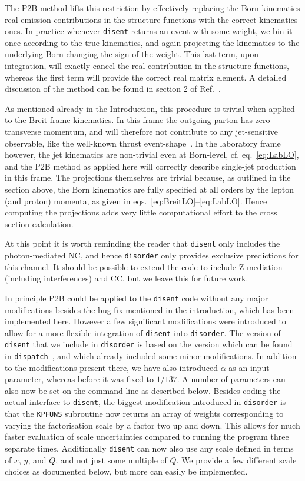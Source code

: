 \documentclass[submission, PhysCodeb]{SciPost_better_arXiv}
\newcommand{\disent}{{\tt disent}}
\newcommand{\disorder}{{\tt disorder}}
\begin{document}
The P2B method lifts this restriction by effectively replacing the
Born-kinematics real-emission contributions in the structure functions
with the correct kinematics ones. In practice whenever \disent{}
returns an event with some weight, we bin it once according to the
true kinematics, and again projecting the kinematics to the underlying
Born changing the sign of the weight. This last term, upon
integration, will exactly cancel the real contribution in the
structure functions, whereas the first term will provide the correct
real matrix element. A detailed discussion of the method can be found
in section 2 of Ref.~\cite{Currie:2018fgr}.

As mentioned already in the Introduction, this procedure is trivial
when applied to the Breit-frame kinematics. In this frame the outgoing
parton has zero transverse momentum, and will therefore not contribute
to any jet-sensitive observable, like the well-known thrust
event-shape~\cite{Antonelli:1999kx}. In the laboratory frame however,
the jet kinematics are non-trivial even at Born-level,
cf. eq.~\eqref{eq:LabLO}, and the P2B method as applied here will
correctly describe single-jet production in this frame. The
projections themselves are trivial because, as outlined in the section
above, the Born kinematics are fully specified at all orders by the
lepton (and proton) momenta, as given in
eqs.~\eqref{eq:BreitLO}--\eqref{eq:LabLO}. Hence computing the
projections adds very little computational effort to the cross section
calculation.

At this point it is worth reminding the reader that \disent{} only
includes the photon-mediated NC, and hence \disorder{} only provides
exclusive predictions for this channel. It should be possible to
extend the code to include Z-mediation (including interferences) and
CC, but we leave this for future work.

In principle P2B could be applied to the \disent{} code without any
major modifications besides the bug fix mentioned in the introduction,
which has been implemented here. However a few significant
modifications were introduced to allow for a more flexible integration
of \disent{} into \disorder{}. The version of \disent{} that we
include in \disorder{} is based on the version which can be found in
{\tt dispatch}~\cite{Dasgupta:2002dc}, and which already included some
minor modifications. In addition to the modifications present there,
we have also introduced $\alpha$ as an input parameter, whereas before
it was fixed to $1/137$. A number of parameters can also now be set on
the command line as described below. Besides coding the actual
interface to \disent{}, the biggest modification introduced in
\disorder{} is that the {\tt KPFUNS} subroutine now returns an array
of weights corresponding to varying the factorisation scale by a
factor two up and down. This allows for much faster evaluation of
scale uncertainties compared to running the program three separate
times. Additionally \disent{} can now also use any scale defined in
terms of $x$, $y$, and $Q$, and not just some multiple of $Q$. We
provide a few different scale choices as documented below, but more
can easily be implemented.
\end{document}
